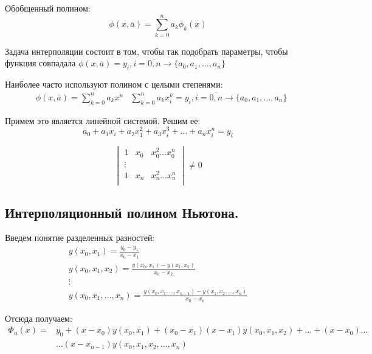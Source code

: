 \begin{definition}
Обобщенный полином: \[
\phi(x,\overline{a}) = \sum\limits_{k=0}^{n}a_{k}\phi_{k}(x)
\] 
\end{definition}

Задача интерполяции состоит в том, чтобы так подобрать параметры, чтобы функция совпадала
 $\phi(x,\overline{a}) = y_{i}, i=\overline{0,n} \to \{a_0,a_1,\ldots,a_{n}\} $

Наиболее часто используют полином с целыми степенями:
\begin{align*}
&\phi(x,\overline{a}) = \sum\limits_{k=0}^{n}a_{k}x^{n}
&\sum\limits_{k=0}^{n}a_{k}x_{i}^{k} = y_{i}, i=\overline{0,n} \to \{a_0,a_1,\ldots,a_{n}\}    
\end{align*}

Примем это является линейной системой. Решим ее: \[
a_0 + a_1x_{i} + a_2x_1^{2} + a_3x_{i}^{3} + \ldots + a_{n}x_{i}^{n} = y_{i}
\]

\[
\begin{vmatrix}
    1 & x_{0} & x_{0}^{2} \ldots x_{0}^{n} \\
    \vdots \\
    1 & x_{n} & x_{n}^{2} \ldots x_{n}^{n} \\

\end{vmatrix} \neq 0
\] 

\subsection{Интерполяционный полином Ньютона.}

\begin{definition}
Введем понятие разделенных разностей:
\begin{gather*}
    y(x_0,x_1) = \frac{y_0-y_1}{x_0-x_1} \\
    y(x_0,x_1,x_2) = \frac{y(x_0,x_1) - y(x_1,x_2)}{x_0-x_2} \\
    \vdots \\
    y(x_0,x_1,\ldots,x_{n})=\frac{y(x_0,x_1,\ldots,x_{n-1}) - y(x_1,x_2,\ldots,x_{n})}{x_0-x_{n}}
\end{gather*}
\end{definition}

Отсюда получаем:
\begin{align*}
\Phi_{n}(x) =& y_0 + (x-x_0)y(x_0,x_1) + (x_0-x_1)(x-x_1)y(x_0,x_1,x_2) + \ldots + (x-x_0)\ldots \\
&\ldots(x-x_{n-1})y(x_0,x_1,x_2,\ldots,x_{n})
\end{align*}

